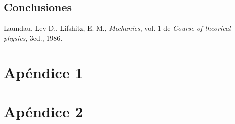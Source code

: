 \documentclass[10pt,a4paper]{article}
\begin{document}
\begin{multicols}{2}

\section{Conclusiones}
\blindtext[2]

\begin{thebibliography}{3}
    Laundau, Lev D., Lifshitz, E. M., \emph{Mechanics}, vol. 1 de \emph{Course of theorical physics}, 3ed., 1986.
\end{thebibliography}

\end{multicols}

\newpage
\begin{multicols}{2}
\appendix
\section{Apéndice 1}
\blindtext
\section{Apéndice 2}
\blindtext
\end{multicols}
\end{document}

